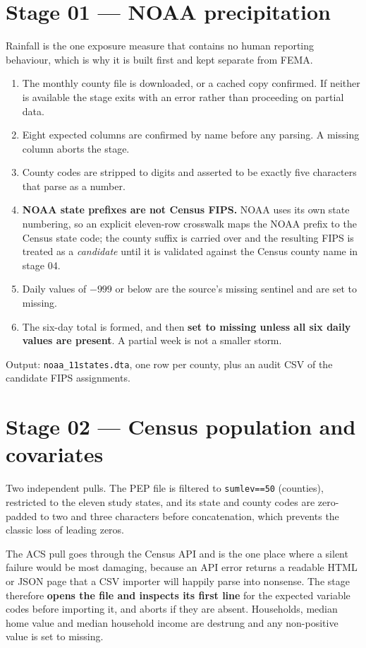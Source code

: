 \documentclass[11pt,a4paper]{article}
\newcommand{\file}[1]{\texttt{\small #1}}
\begin{document}
\section{Stage 01 --- NOAA precipitation}

Rainfall is the one exposure measure that contains no human reporting
behaviour, which is why it is built first and kept separate from FEMA.

\begin{enumerate}[leftmargin=1.3em,itemsep=2pt]
\item The monthly county file is downloaded, or a cached copy confirmed. If
      neither is available the stage exits with an error rather than
      proceeding on partial data.
\item Eight expected columns are confirmed by name before any parsing. A
      missing column aborts the stage.
\item County codes are stripped to digits and asserted to be exactly five
      characters that parse as a number.
\item \textbf{NOAA state prefixes are not Census FIPS.} NOAA uses its own
      state numbering, so an explicit eleven-row crosswalk maps the NOAA
      prefix to the Census state code; the county suffix is carried over and
      the resulting FIPS is treated as a \emph{candidate} until it is
      validated against the Census county name in stage 04.
\item Daily values of $-999$ or below are the source's missing sentinel and
      are set to missing.
\item The six-day total is formed, and then
      \textbf{set to missing unless all six daily values are present}. A
      partial week is not a smaller storm.
\end{enumerate}

\noindent Output: \file{noaa\_11states.dta}, one row per county, plus an audit
CSV of the candidate FIPS assignments.

\section{Stage 02 --- Census population and covariates}

Two independent pulls. The PEP file is filtered to \texttt{sumlev==50}
(counties), restricted to the eleven study states, and its state and county
codes are zero-padded to two and three characters before concatenation, which
prevents the classic loss of leading zeros.

The ACS pull goes through the Census API and is the one place where a silent
failure would be most damaging, because an API error returns a readable HTML
or JSON page that a CSV importer will happily parse into nonsense. The stage
therefore \textbf{opens the file and inspects its first line} for the expected
variable codes before importing it, and aborts if they are absent. Households,
median home value and median household income are destrung and any
non-positive value is set to missing.
\end{document}
